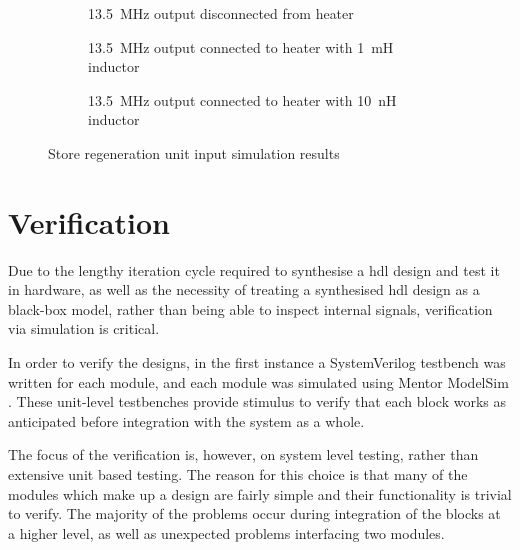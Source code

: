 \begin{figure}[ht]
	\centering
	
	\begin{subfigure}[b]{0.9\textwidth}
		\centering
		\caption{\SI{13.5}{\mega\hertz} output disconnected from heater}
		\label{fig:rf-disconnected}
	\end{subfigure}

	\begin{subfigure}[b]{0.9\textwidth}
		\centering
		\caption{\SI{13.5}{\mega\hertz} output connected to heater with \SI{1}{\milli\henry} inductor}
		\label{fig:rf-1mh}
	\end{subfigure}

	\begin{subfigure}[b]{0.9\textwidth}
		\centering
		\caption{\SI{13.5}{\mega\hertz} output connected to heater with \SI{10}{\nano\henry} inductor}
		\label{fig:rf-10nh}
	\end{subfigure}
	
	
	\caption{Store regeneration unit input simulation results}
	\label{fig:store-regen-input-sim-res}
\end{figure}

\FloatBarrier
\section{ Verification} \label{sec:hdl-verif}
Due to the lengthy iteration cycle required to synthesise a \gls{hdl} design and test it in hardware, as well as the necessity of treating a synthesised \gls{hdl} design as a black-box model, rather than being able to inspect internal signals, verification via simulation is critical.

In order to verify the designs, in the first instance a SystemVerilog testbench was written for each module, and each module was simulated using Mentor ModelSim \cite{mentor2017}. These unit-level testbenches provide stimulus to verify that each block works as anticipated before integration with the system as a whole.

The focus of the verification is, however, on system level testing, rather than extensive unit based testing. The reason for this choice is that many of the modules which make up a design are fairly simple and their functionality is trivial to verify. The majority of the problems occur during integration of the blocks at a higher level, as well as unexpected problems interfacing two modules.

